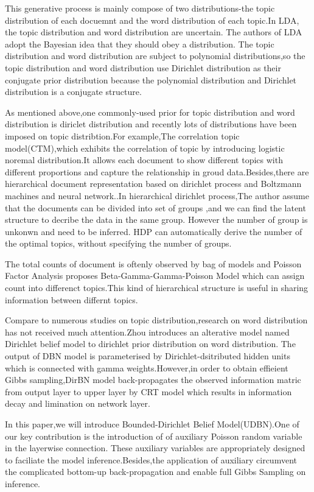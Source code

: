 This generative process is mainly compose of two distributions-the topic distribution of each docuemnt and the word distribution of each topic.In LDA, the topic distribution and word distribution are uncertain. The authors of LDA adopt the Bayesian idea that they should obey a distribution. The topic distribution and word distribution are subject to  polynomial distributions,so the topic distribution and word distribution use Dirichlet distribution as their conjugate prior distribution because the polynomial distribution and Dirichlet distribution is a conjugate structure.

As mentioned above,one commonly-used prior for topic distribution and word distribution is diriclet distribution and recently lots of distributions have been imposed on topic distribtion.For example,The correlation topic model(CTM)\cite{corr},which exhibits the correlation of topic by introducing logistic noremal distribution.It allows each document to show different topics with different proportions and capture the relationship in groud data.Besides,there are hierarchical document representation based on dirichlet process and Boltzmann machines and neural network.\cite{zhao}.In hierarchical dirichlet process,The author assume that the documents can be divided into set of groups ,and we can find the latent structure to  decribe the data in the same group. However the number of group is unkonwn and need to be inferred. HDP  can automatically derive the number of the optimal topics, without specifying the number of groups.

The total counts of document is oftenly observed by bag of models and Poisson Factor Analysis\cite{Poisson facotr analysis} proposes Beta-Gamma-Gamma-Poisson Model which can assign count into differenct topics.This kind of hierarchical structure is useful in sharing information between differnt topics.

Compare to numerous studies on topic distribution,research on word distribution has not received much attention.Zhou\cite{dirbn} introduces an alterative model named Dirichlet belief model to dirichlet prior distribution on word distribution. The output of DBN model is parameterised by Dirichlet-dsitributed hidden units which is connected with gamma weights.However,in order to obtain effieient Gibbs sampling,DirBN model back-propagates the observed information matric from output layer to upper layer by CRT\cite{} model which results in information decay and limination on network layer.

In this paper,we will introduce Bounded-Dirichlet Belief Model(UDBN).One of our key contribution is the introduction of of auxiliary Poisson random variable in the layerwise connection. These auxiliary variables are appropriately designed to faciliate the model inference.Besides,the application of auxiliary circumvent the complicated bottom-up back-propagation and enable full Gibbs Sampling on inference.

